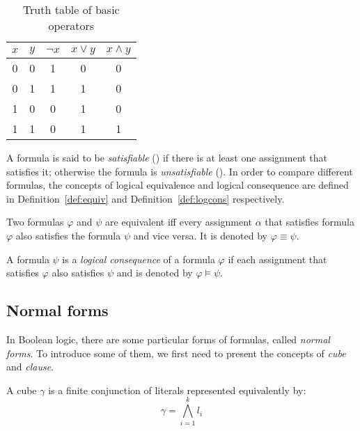 \begin{table}[!htbp]
 \centering
 \begin{tabular}{cc|ccc}
  $x$ & $y$ & $\neg x$ & $x \lor y$ & $x \land y$ \\
  \toprule
  0 & 0 & 1 & 0 & 0 \\
  \midrule
  0 & 1 & 1 & 1 & 0 \\
  \midrule
  1 & 0 & 0 & 1 & 0 \\
  \midrule
  1 & 1 & 0 & 1 & 1 \\
  \bottomrule
 \end{tabular}
 \caption{Truth table of basic operators}
 \label{tab:truthtable}
\end{table}
A formula is said to be
\emph{satisfiable} (\sat) if there is at least one assignment that satisfies it;
otherwise the formula is \emph{unsatisfiable} (\unsat).
In order to compare different formulas, the concepts of logical equivalence and logical consequence
are defined in Definition~\ref{def:equiv} and Definition~\ref{def:logcons} respectively.

\vspace{1em}

\begin{definition}\label{def:equiv}
 Two formulas $\varphi$ and $\psi$ are equivalent iff every assignment $\alpha$ that satisfies 
 formula $\varphi$  also satisfies the formula $\psi$ and vice versa. It is denoted by $\varphi \equiv \psi$.
\end{definition}


\begin{definition}\label{def:logcons}
 A formula $\psi$ is a \emph{logical consequence} of a formula $\varphi$ if each assignment that satisfies $\varphi$
  also satisfies $\psi$ and is denoted by $\varphi \models \psi$.
\end{definition}

\subsection{Normal forms}
In Boolean logic, there are some particular forms of formulas, called \emph{normal forms}.
 To introduce some of them, we first need to present the concepts of \emph{cube} and \emph{clause}.
\begin{definition}[Cube]
A cube $\gamma$ is a finite conjunction of literals represented equivalently by:
$$\gamma = \bigwedge_{i=1}^k l_i $$
\end{definition}

